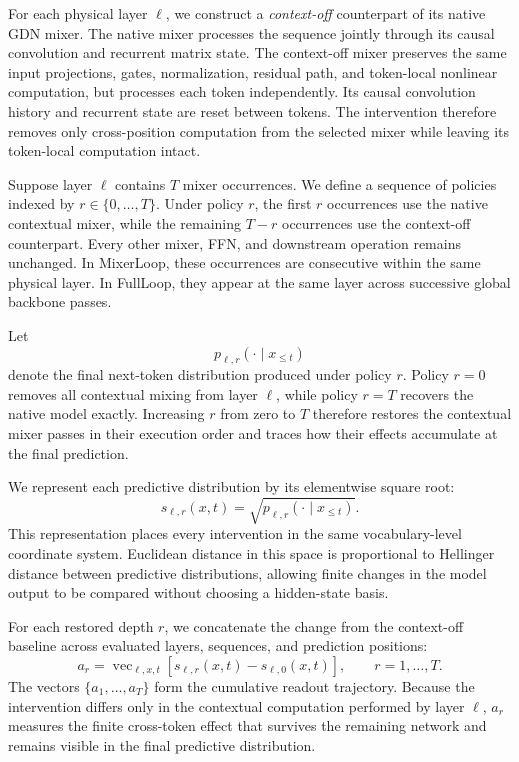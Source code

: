\documentclass{article}
\begin{document}
For each physical layer $\ell$, we construct a \emph{context-off} counterpart
of its native GDN mixer. The native mixer processes the sequence jointly through
its causal convolution and recurrent matrix state. The context-off mixer
preserves the same input projections, gates, normalization, residual path, and
token-local nonlinear computation, but processes each token independently. Its
causal convolution history and recurrent state are reset between tokens. The
intervention therefore removes only cross-position computation from the
selected mixer while leaving its token-local computation intact.

Suppose layer $\ell$ contains $T$ mixer occurrences. We define a sequence of
policies indexed by $r\in\{0,\ldots,T\}$. Under policy $r$, the first $r$
occurrences use the native contextual mixer, while the remaining $T-r$
occurrences use the context-off counterpart. Every other mixer, FFN, and
downstream operation remains unchanged. In MixerLoop, these occurrences are
consecutive within the same physical layer. In FullLoop, they appear at the
same layer across successive global backbone passes.

Let
\begin{equation}
p_{\ell,r}(\cdot\mid x_{\leq t})
\label{eq:intervention_distribution}
\end{equation}
denote the final next-token distribution produced under policy $r$. Policy
$r=0$ removes all contextual mixing from layer $\ell$, while policy $r=T$
recovers the native model exactly. Increasing $r$ from zero to $T$ therefore
restores the contextual mixer passes in their execution order and traces how
their effects accumulate at the final prediction.

We represent each predictive distribution by its elementwise square root:
\begin{equation}
s_{\ell,r}(x,t)
=\sqrt{
p_{\ell,r}(\cdot\mid x_{\leq t})
}.
\label{eq:sqrt_probability}
\end{equation}
This representation places every intervention in the same vocabulary-level
coordinate system. Euclidean distance in this space is proportional to
Hellinger distance between predictive distributions, allowing finite changes
in the model output to be compared without choosing a hidden-state basis.

For each restored depth $r$, we concatenate the change from the context-off
baseline across evaluated layers, sequences, and prediction positions:
\begin{equation}
a_r
=\operatorname{vec}_{\ell,x,t}\!\left[
s_{\ell,r}(x,t)-s_{\ell,0}(x,t)
\right],
\qquad
r=1,\ldots,T.
\label{eq:readout_trajectory}
\end{equation}
The vectors $\{a_1,\ldots,a_T\}$ form the cumulative readout trajectory.
Because the intervention differs only in the contextual computation performed
by layer $\ell$, $a_r$ measures the finite cross-token effect that survives the
remaining network and remains visible in the final predictive distribution.
\end{document}
